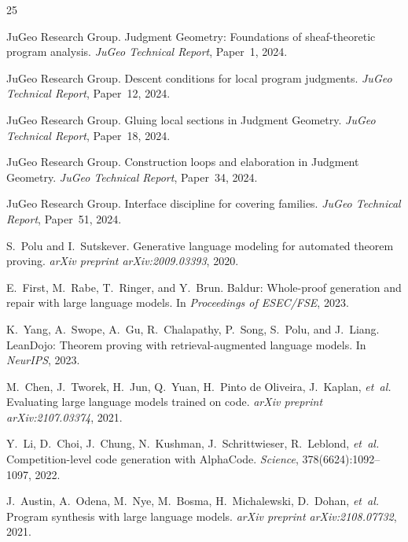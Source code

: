 \documentclass[11pt]{article}
\begin{document}
\begin{thebibliography}{25}

JuGeo Research Group.
\newblock Judgment Geometry: Foundations of sheaf-theoretic program
  analysis.
\newblock \emph{JuGeo Technical Report}, Paper~1, 2024.

JuGeo Research Group.
\newblock Descent conditions for local program judgments.
\newblock \emph{JuGeo Technical Report}, Paper~12, 2024.

JuGeo Research Group.
\newblock Gluing local sections in Judgment Geometry.
\newblock \emph{JuGeo Technical Report}, Paper~18, 2024.

JuGeo Research Group.
\newblock Construction loops and elaboration in Judgment Geometry.
\newblock \emph{JuGeo Technical Report}, Paper~34, 2024.

JuGeo Research Group.
\newblock Interface discipline for covering families.
\newblock \emph{JuGeo Technical Report}, Paper~51, 2024.

S.~Polu and I.~Sutskever.
\newblock Generative language modeling for automated theorem proving.
\newblock \emph{arXiv preprint arXiv:2009.03393}, 2020.

E.~First, M.~Rabe, T.~Ringer, and Y.~Brun.
\newblock Baldur: Whole-proof generation and repair with large
  language models.
\newblock In \emph{Proceedings of ESEC/FSE}, 2023.

K.~Yang, A.~Swope, A.~Gu, R.~Chalapathy, P.~Song, S.~Polu,
  and J.~Liang.
\newblock LeanDojo: Theorem proving with retrieval-augmented
  language models.
\newblock In \emph{NeurIPS}, 2023.

M.~Chen, J.~Tworek, H.~Jun, Q.~Yuan, H.~Pinto de Oliveira,
  J.~Kaplan, \emph{et~al.}
\newblock Evaluating large language models trained on code.
\newblock \emph{arXiv preprint arXiv:2107.03374}, 2021.

Y.~Li, D.~Choi, J.~Chung, N.~Kushman, J.~Schrittwieser,
  R.~Leblond, \emph{et~al.}
\newblock Competition-level code generation with {AlphaCode}.
\newblock \emph{Science}, 378(6624):1092--1097, 2022.

J.~Austin, A.~Odena, M.~Nye, M.~Bosma, H.~Michalewski,
  D.~Dohan, \emph{et~al.}
\newblock Program synthesis with large language models.
\newblock \emph{arXiv preprint arXiv:2108.07732}, 2021.


\end{thebibliography}
\end{document}
